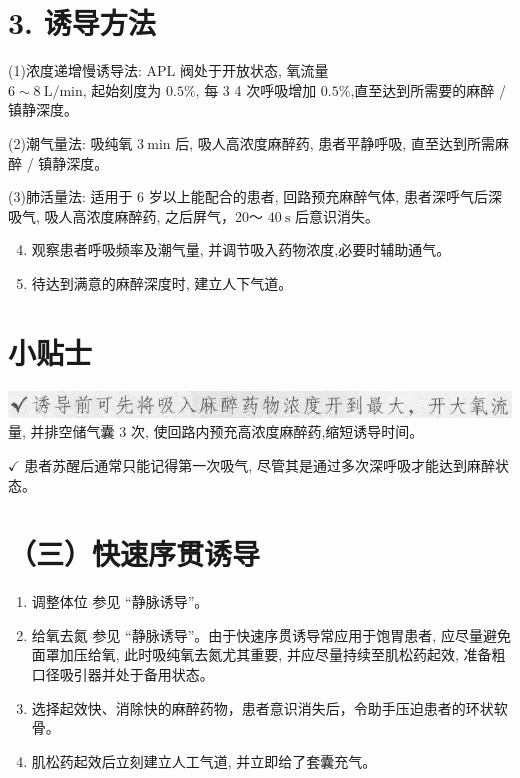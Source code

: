 \documentclass[10pt]{article}
\begin{document}
\section*{3. 诱导方法}
(1)浓度递增慢诱导法: APL 阀处于开放状态, 氧流量\\
$6 \sim 8 \mathrm{~L} / \mathrm{min}$, 起始刻度为 $0.5 \%$, 每 3 4 次呼吸增加 $0.5 \%$,直至达到所需要的麻醉 / 镇静深度。

(2)潮气量法: 吸纯氧 $3 \mathrm{~min}$ 后, 吸人高浓度麻醉药, 患者平静呼吸, 直至达到所需麻醉 / 镇静深度。

(3)肺活量法: 适用于 6 岁以上能配合的患者, 回路预充麻醉气体, 患者深呼气后深吸气, 吸人高浓度麻醉药, 之后屏气，20～ $40 \mathrm{~s}$ 后意识消失。

\begin{enumerate}
  \setcounter{enumi}{3}
  \item 观察患者呼吸频率及潮气量, 并调节吸入药物浓度,必要时辅助通气。

  \item 待达到满意的麻醉深度时, 建立人下气道。

\end{enumerate}

\section*{小贴士}
\includegraphics[max width=\textwidth, center]{2024_07_05_645bb794a4d4f32ee0c8g-083}\\
量, 并排空储气囊 3 次, 使回路内预充高浓度麻醉药,缩短诱导时间。

$\checkmark$ 患者苏醒后通常只能记得第一次吸气, 尽管其是通过多次深呼吸才能达到麻醉状态。

\section*{（三）快速序贯诱导}
\begin{enumerate}
  \item 调整体位 参见 “静脉诱导”。

  \item 给氧去氮 参见 “静脉诱导”。由于快速序贯诱导常应用于饱胃患者, 应尽量避免面罩加压给氧, 此时吸纯氧去氮尤其重要, 并应尽量持续至肌松药起效, 准备粗口径吸引器并处于备用状态。

  \item 选择起效快、消除快的麻醉药物，患者意识消失后，令助手压迫患者的环状软骨。

  \item 肌松药起效后立刻建立人工气道, 并立即给了套囊充气。

\end{enumerate}
\end{document}
